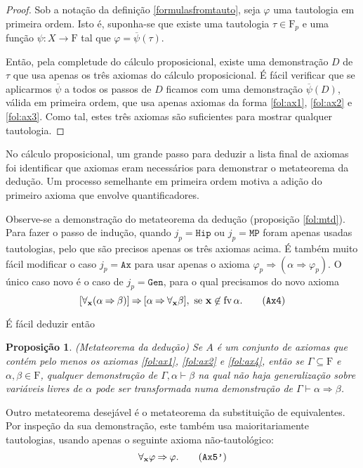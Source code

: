 \documentclass{report}
\newtheorem{prop}{Proposição}
\theoremstyle{definition}
\theoremstyle{remark}
\renewcommand{\bf}[1]{\mathbf{#1}}
\newcommand{\F}{\mathrm{F}}
\DeclareMathOperator{\fv}{fv}
\newcommand{\imply}{\mathbin{\Rightarrow}}
\begin{document}
	\begin{proof}
	Sob a notação da definição \ref{formulasfromtauto}, seja $\varphi$ uma tautologia em primeira ordem. Isto é, suponha-se que existe uma tautologia $\tau \in \F_p$ e uma função $\psi : X \to \F$ tal que $\varphi = \overline \psi(\tau)$.

	Então, pela completude do cálculo proposicional, existe uma demonstração $D$ de $\tau$ que usa apenas os três axiomas do cálculo proposicional. É fácil verificar que se aplicarmos $\overline \psi$ a todos os passos de $D$ ficamos com uma demonstração $\overline \psi(D)$, válida em primeira ordem, que usa apenas axiomas da forma \eqref{fol:ax1}, \eqref{fol:ax2} e \eqref{fol:ax3}. Como tal, estes três axiomas são suficientes para mostrar qualquer tautologia.
	\end{proof}

	No cálculo proposicional, um grande passo para deduzir a lista final de axiomas foi identificar que axiomas eram necessários para demonstrar o metateorema da dedução. Um processo semelhante em primeira ordem motiva a adição do primeiro axioma que envolve quantificadores.

	Observe-se a demonstração do metateorema da dedução (proposição \ref{fol:mtd}). Para fazer o passo de indução, quando $j_p = \mathtt{Hip}$ ou $j_p = \mathtt{MP}$ foram apenas usadas tautologias, pelo que são precisos apenas os três axiomas acima. É também muito fácil modificar o caso $j_p = \mathtt{Ax}$ para usar apenas o axioma $\varphi_p \imply (\alpha \imply \varphi_p)$. O único caso novo é o caso de $j_p = \mathtt{Gen}$, para o qual precisamos do novo axioma
\begin{equation}\label{fol:ax4}
[\forall_{\bf x}(\alpha \imply \beta)] \imply [\alpha \imply \forall_{\bf x} \beta], \text{ se $\bf x \not \in \fv \alpha$.} \tag{\texttt{Ax4}}
\end{equation}

	É fácil deduzir então
	\begin{prop} (Metateorema da dedução) 
	Se $A$ é um conjunto de axiomas que contém pelo menos os axiomas \eqref{fol:ax1}, \eqref{fol:ax2} e \eqref{fol:ax4}, então se $\Gamma \subseteq \F$ e $\alpha, \beta \in \F$, qualquer demonstração de $\Gamma, \alpha \vdash \beta$ na qual não haja generalização sobre variáveis livres de $\alpha$ pode ser transformada numa demonstração de $\Gamma \vdash \alpha \imply \beta$.
	\end{prop}

	Outro metateorema desejável é o metateorema da substituição de equivalentes. Por inspeção da sua demonstração, este também usa maioritariamente tautologias, usando apenas o seguinte axioma não-tautológico:
\begin{equation}\label{fol:ax5}
\forall_{\bf x} \varphi \imply \varphi.\tag{\texttt{Ax5'}}
\end{equation}
\end{document}
